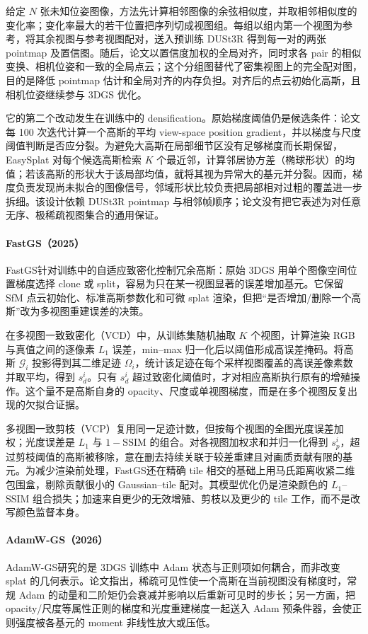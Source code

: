 给定 $N$ 张未知位姿图像，方法先计算相邻图像的余弦相似度，并取相邻相似度的变化率；变化率最大的若干位置把序列切成视图组。每组以组内第一个视图为参考，将其余视图与参考视图配对，送入预训练 DUSt3R 得到每一对的两张 pointmap 及置信图。随后，论文以置信度加权的全局对齐，同时求各 pair 的相似变换、相机位姿和一致的全局点云；这个分组图替代了密集视图上的完全配对图，目的是降低 pointmap 估计和全局对齐的内存负担。对齐后的点云初始化高斯，且相机位姿继续参与 3DGS 优化。

它的第二个改动发生在训练中的 densification。原始梯度阈值仍是候选条件：论文每 100 次迭代计算一个高斯的平均 view-space position gradient，并以梯度与尺度阈值判断是否应分裂。为避免大高斯在局部细节区没有足够梯度而长期保留，EasySplat 对每个候选高斯检索 $K$ 个最近邻，计算邻居协方差（椭球形状）的均值；若该高斯的形状大于该局部均值，就将其视为异常大的基元并分裂。因而，梯度负责发现尚未拟合的图像信号，邻域形状比较负责把局部相对过粗的覆盖进一步拆细。该设计依赖 DUSt3R pointmap 与相邻帧顺序；论文没有把它表述为对任意无序、极稀疏视图集合的通用保证。

\paragraph{FastGS（2025）\cite{2511_04283}}
FastGS针对训练中的自适应致密化控制冗余高斯：原始 3DGS 用单个图像空间位置梯度选择 clone 或 split，容易为只在某一视图显著的误差增加基元。它保留 SfM 点云初始化、标准高斯参数化和可微 splat 渲染，但把“是否增加/删除一个高斯”改为多视图重建误差的决策。

在多视图一致致密化（VCD）中，从训练集随机抽取 $K$ 个视图，计算渲染 RGB 与真值之间的逐像素 $L_1$ 误差，min--max 归一化后以阈值形成高误差掩码。将高斯 $\mathcal G_i$ 投影得到其二维足迹 $\Omega_i$，统计该足迹在每个采样视图覆盖的高误差像素数并取平均，得到 $s_d^i$。只有 $s_d^i$ 超过致密化阈值时，才对相应高斯执行原有的增殖操作。这个量不是高斯自身的 opacity、尺度或单视图梯度，而是在多个视图反复出现的欠拟合证据。

多视图一致剪枝（VCP）复用同一足迹计数，但按每个视图的全图光度误差加权；光度误差是 $L_1$ 与 $1-\mathrm{SSIM}$ 的组合。对各视图加权求和并归一化得到 $s_p^i$，超过剪枝阈值的高斯被移除，意在删去持续关联于较差重建且对画质贡献有限的基元。为减少渲染前处理，FastGS还在精确 tile 相交的基础上用马氏距离收紧二维包围盒，剔除贡献很小的 Gaussian--tile 配对。其模型优化仍是渲染颜色的 $L_1$--SSIM 组合损失；加速来自更少的无效增殖、剪枝以及更少的 tile 工作，而不是改写颜色监督本身。

\paragraph{AdamW-GS（2026）\cite{2601_16736}}
AdamW-GS研究的是 3DGS 训练中 Adam 状态与正则项如何耦合，而非改变 splat 的几何表示。论文指出，稀疏可见性使一个高斯在当前视图没有梯度时，常规 Adam 的动量和二阶矩仍会衰减并影响以后重新可见时的步长；另一方面，把 opacity/尺度等属性正则的梯度和光度重建梯度一起送入 Adam 预条件器，会使正则强度被各基元的 moment 非线性放大或压低。

